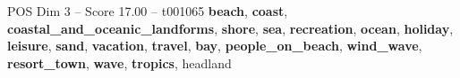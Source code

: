 \begin{textsample}{POS Dim 3 – Score 17.00 – t001065}  \label{ex:f3_pos_020}
\textbf{beach}, \textbf{coast}, \textbf{coastal\_and\_oceanic\_landforms}, \textbf{shore}, \textbf{sea}, \textbf{recreation}, \textbf{ocean}, \textbf{holiday}, \textbf{leisure}, \textbf{sand}, \textbf{vacation}, \textbf{travel}, \textbf{bay}, \textbf{people\_on\_beach}, \textbf{wind\_wave}, \textbf{resort\_town}, \textbf{wave}, \textbf{tropics}, headland

\end{textsample}
